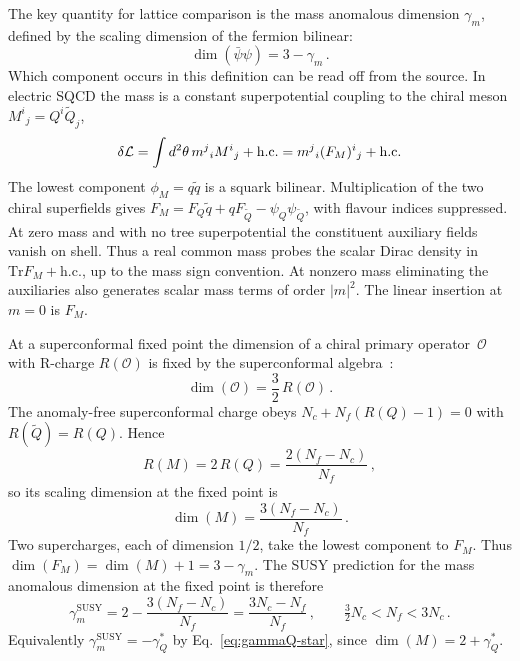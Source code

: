 \documentclass[11pt,a4paper]{article}
\theoremstyle{plain}
\theoremstyle{definition}
\theoremstyle{remark}
\newcommand{\Nc}{N_{\!c}}
\newcommand{\Nf}{N_{\!f}}
\newcommand{\Tr}{\mathrm{Tr}}
\begin{document}
The key quantity for lattice comparison is the mass anomalous dimension
$\gamma_m$, defined by the scaling dimension of the fermion bilinear:
\begin{equation}\label{eq:gamma-m-def}
  \dim(\bar\psi\psi) = 3 - \gamma_m\,.
\end{equation}
Which component occurs in this definition can be read off from the
source.  In electric SQCD the mass is a constant superpotential coupling
to the chiral meson $M^i{}_j=Q^i\widetilde Q_j$,
\begin{equation}\label{eq:mass-source}
  \delta{\cal L}=\int d^2\theta\,m^j{}_i M^i{}_j+\mathrm{h.c.}
  =m^j{}_i(F_M)^i{}_j+\mathrm{h.c.}
\end{equation}
The lowest component $\phi_M=q\tilde q$ is a squark bilinear.
Multiplication of the two chiral superfields gives
$F_M=F_Q\tilde q+qF_{\widetilde Q}-\psi_Q\psi_{\widetilde Q}$, with
flavour indices suppressed.  At zero mass and with no tree
superpotential the constituent auxiliary fields vanish on shell.
Thus a real common mass probes the scalar Dirac density in
$\Tr F_M+\mathrm{h.c.}$, up to the mass sign convention.  At nonzero
mass eliminating the auxiliaries also generates scalar mass terms of
order $|m|^2$.  The linear insertion at $m=0$ is $F_M$.

At a superconformal fixed point the dimension of a chiral primary
operator~$\mathcal{O}$ with R-charge $R(\mathcal{O})$ is fixed by the
superconformal algebra~\cite{Seiberg1995,IS1996}:
\begin{equation}\label{eq:dim-R}
  \dim(\mathcal{O}) = \frac{3}{2}\, R(\mathcal{O})\,.
\end{equation}
The anomaly-free superconformal charge obeys
$\Nc+\Nf(R(Q)-1)=0$ with $R(\widetilde Q)=R(Q)$.  Hence
\begin{equation}\label{eq:R-meson}
  R(M) = 2\,R(Q) = \frac{2(\Nf - \Nc)}{\Nf}\,,
\end{equation}
so its scaling dimension at the fixed point is
\begin{equation}\label{eq:dim-meson}
  \dim(M) = \frac{3(\Nf - \Nc)}{\Nf}\,.
\end{equation}
Two supercharges, each of dimension $1/2$, take the lowest component
to $F_M$.  Thus $\dim(F_M)=\dim(M)+1=3-\gamma_m$.  The SUSY
prediction for the mass anomalous dimension at the fixed point is
therefore
\begin{equation}\label{eq:gamma-SUSY}
  \boxed{
    \gamma_m^{\mathrm{SUSY}} = 2 - \frac{3(\Nf - \Nc)}{\Nf}
    = \frac{3\Nc - \Nf}{\Nf}\,,
    \qquad \tfrac{3}{2}\Nc < \Nf < 3\Nc\,.
  }
\end{equation}
Equivalently $\gamma_m^{\mathrm{SUSY}} = -\gamma_Q^*$ by
Eq.~\eqref{eq:gammaQ-star}, since $\dim(M) = 2 + \gamma_Q^*$.
\end{document}
